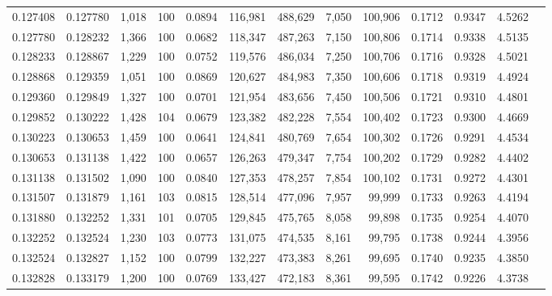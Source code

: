 \begin{tabular}{rrrrrrrrrrrrr}
0.127408 & 0.127780 & 1,018 & 100 &                                     0.0894 & 116,981 & 488,629 &   7,050 & 100,906 & 0.1712 & 0.9347 & 4.5262 \\
0.127780 & 0.128232 & 1,366 & 100 &                                     0.0682 & 118,347 & 487,263 &   7,150 & 100,806 & 0.1714 & 0.9338 & 4.5135 \\
0.128233 & 0.128867 & 1,229 & 100 &                                     0.0752 & 119,576 & 486,034 &   7,250 & 100,706 & 0.1716 & 0.9328 & 4.5021 \\
0.128868 & 0.129359 & 1,051 & 100 &                                     0.0869 & 120,627 & 484,983 &   7,350 & 100,606 & 0.1718 & 0.9319 & 4.4924 \\
0.129360 & 0.129849 & 1,327 & 100 &                                     0.0701 & 121,954 & 483,656 &   7,450 & 100,506 & 0.1721 & 0.9310 & 4.4801 \\
0.129852 & 0.130222 & 1,428 & 104 &                                     0.0679 & 123,382 & 482,228 &   7,554 & 100,402 & 0.1723 & 0.9300 & 4.4669 \\
0.130223 & 0.130653 & 1,459 & 100 &                                     0.0641 & 124,841 & 480,769 &   7,654 & 100,302 & 0.1726 & 0.9291 & 4.4534 \\
0.130653 & 0.131138 & 1,422 & 100 &                                     0.0657 & 126,263 & 479,347 &   7,754 & 100,202 & 0.1729 & 0.9282 & 4.4402 \\
0.131138 & 0.131502 & 1,090 & 100 &                                     0.0840 & 127,353 & 478,257 &   7,854 & 100,102 & 0.1731 & 0.9272 & 4.4301 \\
0.131507 & 0.131879 & 1,161 & 103 &                                     0.0815 & 128,514 & 477,096 &   7,957 &  99,999 & 0.1733 & 0.9263 & 4.4194 \\
0.131880 & 0.132252 & 1,331 & 101 &                                     0.0705 & 129,845 & 475,765 &   8,058 &  99,898 & 0.1735 & 0.9254 & 4.4070 \\
0.132252 & 0.132524 & 1,230 & 103 &                                     0.0773 & 131,075 & 474,535 &   8,161 &  99,795 & 0.1738 & 0.9244 & 4.3956 \\
0.132524 & 0.132827 & 1,152 & 100 &                                     0.0799 & 132,227 & 473,383 &   8,261 &  99,695 & 0.1740 & 0.9235 & 4.3850 \\
0.132828 & 0.133179 & 1,200 & 100 &                                     0.0769 & 133,427 & 472,183 &   8,361 &  99,595 & 0.1742 & 0.9226 & 4.3738 \\

\end{tabular}
